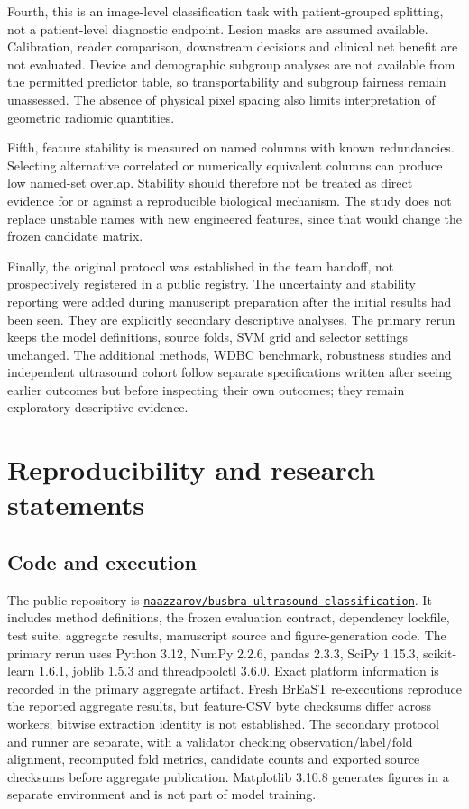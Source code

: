 \documentclass[11pt,a4paper]{article}
\begin{document}
Fourth, this is an image-level classification task with patient-grouped splitting, not a patient-level diagnostic endpoint. Lesion masks are assumed available. Calibration, reader comparison, downstream decisions and clinical net benefit are not evaluated. Device and demographic subgroup analyses are not available from the permitted predictor table, so transportability and subgroup fairness remain unassessed. The absence of physical pixel spacing also limits interpretation of geometric radiomic quantities.

Fifth, feature stability is measured on named columns with known redundancies. Selecting alternative correlated or numerically equivalent columns can produce low named-set overlap. Stability should therefore not be treated as direct evidence for or against a reproducible biological mechanism. The study does not replace unstable names with new engineered features, since that would change the frozen candidate matrix.

Finally, the original protocol was established in the team handoff, not prospectively registered in a public registry. The uncertainty and stability reporting were added during manuscript preparation after the initial results had been seen. They are explicitly secondary descriptive analyses. The primary rerun keeps the model definitions, source folds, SVM grid and selector settings unchanged. The additional methods, WDBC benchmark, robustness studies and independent ultrasound cohort follow separate specifications written after seeing earlier outcomes but before inspecting their own outcomes; they remain exploratory descriptive evidence.

\section{Reproducibility and research statements}
\subsection{Code and execution}
The public repository is \href{https://github.com/naazzarov/busbra-ultrasound-classification}{\texttt{naazzarov/busbra-ultrasound-classification}}. It includes method definitions, the frozen evaluation contract, dependency lockfile, test suite, aggregate results, manuscript source and figure-generation code. The primary rerun uses Python 3.12, NumPy 2.2.6, pandas 2.3.3, SciPy 1.15.3, scikit-learn 1.6.1, joblib 1.5.3 and threadpoolctl 3.6.0. Exact platform information is recorded in the primary aggregate artifact. Fresh BrEaST re-executions reproduce the reported aggregate results, but feature-CSV byte checksums differ across workers; bitwise extraction identity is not established. The secondary protocol and runner are separate, with a validator checking observation/label/fold alignment, recomputed fold metrics, candidate counts and exported source checksums before aggregate publication. Matplotlib 3.10.8 generates figures in a separate environment and is not part of model training.
\end{document}
